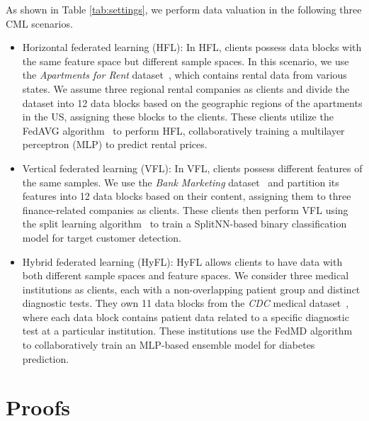 As shown in Table \ref{tab:settings}, we perform data valuation in the following three CML scenarios.
\begin{itemize}[leftmargin=*]
	\item Horizontal federated learning (HFL): In HFL, clients possess data blocks with the same feature space but different sample spaces. In this scenario, we use the \textit{Apartments for Rent} dataset~\citep{apartment_for_rent_classified_555}, which contains rental data from various states. 
	We assume three regional rental companies as clients and divide the dataset into 12 data blocks based on the geographic regions of the apartments in the US, assigning these blocks to the clients. 
	These clients utilize the FedAVG algorithm~\citep{mcmahan2017communication} to perform HFL, collaboratively training a multilayer perceptron (MLP) to predict rental prices.
	\item Vertical federated learning (VFL): In VFL, clients possess different features of the same samples. 
	We use the \textit{Bank Marketing} dataset~\citep{bank_marketing_222} and partition its features into 12 data blocks based on their content, assigning them to three finance-related companies as clients.
	These clients then perform VFL using the split learning algorithm~\cite{gupta2018distributed} to train a SplitNN-based binary classification model for target customer detection.
	\item Hybrid federated learning (HyFL): HyFL allows clients to have data with both different sample spaces and feature spaces. 
	We consider three medical institutions as clients, each with a non-overlapping patient group and distinct diagnostic tests. 
	They own 11 data blocks from the \textit{CDC} medical dataset~\citep{cdc_health_indicators}, where each data block contains patient data related to a specific diagnostic test at a particular institution. 
	These institutions use the FedMD algorithm~\citep{li2019fedmd} to collaboratively train an MLP-based ensemble model for diabetes prediction.
\end{itemize}


\section{Proofs}

